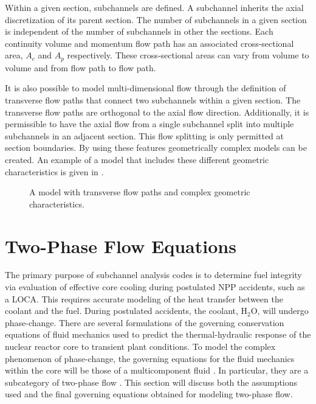 Within a given section, subchannels are defined.
A subchannel inherits the axial discretization of its parent section.
The number of subchannels in a given section is independent of the number of subchannels in other the sections.
Each continuity volume and momentum flow path has an associated cross-sectional area, $A_{c}$ and $A_{p}$ respectively. 
These cross-sectional areas can vary from volume to volume and from flow path to flow path.

It is also possible to model multi-dimensional flow through the definition of transverse flow paths that connect two subchannels within a given section.
The transverse flow paths are orthogonal to the axial flow direction.
Additionally, it is permissible to have the axial flow from a single subchannel split into multiple subchannels in an adjacent section.
This flow splitting is only permitted at section boundaries.
By using these features geometrically complex models can be created.
An example of a model that includes these different geometric characteristics is given in .

\begin{figure}[ht!]
\centering

\caption{A model with transverse flow paths and complex geometric characteristics.}
\label{fig:complex_geometry}
\end{figure}

\section{Two-Phase Flow Equations}
\label{sect:two_phase_flow}
The primary purpose of subchannel analysis codes is to determine fuel integrity via evaluation of effective core cooling during postulated NPP accidents, such as a LOCA.
This requires accurate modeling of the heat transfer between the coolant and the fuel. 
During postulated accidents, the coolant, H$_2$O, will undergo phase-change.
There are several formulations of the governing conservation equations of fluid mechanics used to predict the thermal-hydraulic response of the nuclear reactor core to transient plant conditions.
To model the complex phenomenon of phase-change, the governing equations for the fluid mechanics within the core will be those of a multicomponent fluid \cite{Drew1998}.
In particular, they are a subcategory of two-phase flow \cite{Todreas2011, Stewart1984, Ishii1984}.
This section will discuss both the assumptions used and the final governing equations obtained for modeling two-phase flow.


